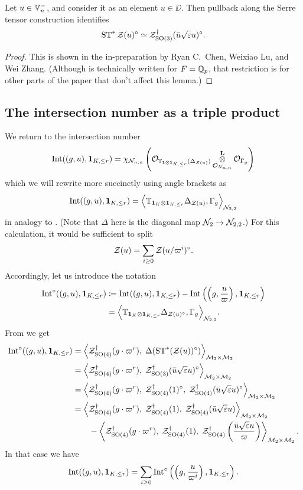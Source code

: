\begin{lemma}
  \label{lem:serre_pullback_divisor}
  Let $u \in \mathbb V_n^-$, and consider it as an element $u \in \DD$.
  Then pullback along the Serre tensor construction identifies
  \[ \operatorname{ST}^\ast \mathcal Z(u)^\circ \simeq \mathcal Z^{\dagger}_{\operatorname{SO}(3)}(\bar u \sqrt{\varepsilon} u)^\circ. \]
\end{lemma}
\begin{proof}
  This is shown in the in-preparation
  \cite{ref:CLZ} by Ryan C.~Chen, Weixiao Lu, and Wei Zhang.
  (Although \cite{ref:CLZ} is technically written for $F = \mathbb Q_p$,
  that restriction is for other parts of the paper that don't affect this lemma.)
\end{proof}

\subsection{The intersection number as a triple product}
We return to the intersection number
\[ \operatorname{Int}((g,u), \mathbf{1}_{K, \le r}) = \chi_{\mathcal N_{n,n}} \left(
      \mathcal{O}_{\mathbb T_{\mathbf{1} \otimes \mathbf{1}_{K, \le r}}(\Delta_{\mathcal Z(u)})}
      \mathop{\otimes}^{\mathbf{L}}_{\mathcal{O}_{\mathcal N_{n,n}}} \mathcal{O}_{\Gamma_g} \right) \]
which we will rewrite more succinctly using angle brackets as
\[ \operatorname{Int}((g,u), \mathbf{1}_{K, \le r}) = \Big\langle
  \mathbb{T}_{\mathbf{1}_K \otimes \mathbf{1}_{K, \le r}}
  \Delta_{\mathcal Z(u)}, \Gamma_g \Big\rangle_{\mathcal N_{2,2}} \]
in analogy to \cite[\S6.1]{ref:AFLspherical}.
(Note that $\Delta$ here is the diagonal map $\mathcal N_2 \to \mathcal N_{2,2}$.)
For this calculation, it would be sufficient to split
\[ \mathcal Z(u) = \sum_{i \ge 0} \mathcal Z(u/\varpi^i)^\circ. \]
Accordingly, let us introduce the notation
\begin{align*}
  \operatorname{Int}^\circ((g,u), \mathbf{1}_{K, \le r})
  &\coloneqq \operatorname{Int}((g,u), \mathbf{1}_{K, \le r}) - \operatorname{Int}\left( \left( g, \frac{u}{\varpi} \right), \mathbf{1}_{K, \le r} \right) \\
  &= \Big\langle \mathbb{T}_{\mathbf{1}_K \otimes \mathbf{1}_{K, \le r}}
    \Delta_{\mathcal Z(u)^\circ}, \Gamma_g \Big\rangle_{\mathcal N_{2,2}}.
\end{align*}
From  we get
\begin{align*}
  \operatorname{Int}^\circ((g,u), \mathbf{1}_{K, \le r})
  &= \left< \mathcal Z^{\dagger}_{\operatorname{SO}(4)}(g \cdot \varpi^r), \; \Delta(\operatorname{ST}^\ast(\mathcal Z(u))^\circ) \right>_{\mathcal M_2 \times \mathcal M_2} \\
  &= \left< \mathcal Z^{\dagger}_{\operatorname{SO}(4)}(g \cdot \varpi^r), \; \mathcal Z^{\dagger}_{\operatorname{SO}(3)}(\bar u \sqrt{\varepsilon} u)^\circ \right>_{\mathcal M_2 \times \mathcal M_2} \\
  &= \left< \mathcal Z^{\dagger}_{\operatorname{SO}(4)}(g \cdot \varpi^r), \; \mathcal Z^{\dagger}_{\operatorname{SO}(4)}(1)^\circ, \; \mathcal Z^{\dagger}_{\operatorname{SO}(4)}(\bar u \sqrt{\varepsilon} u)^\circ \right>_{\mathcal M_2 \times \mathcal M_2} \\
  &= \left< \mathcal Z^{\dagger}_{\operatorname{SO}(4)}(g \cdot \varpi^r), \; \mathcal Z^{\dagger}_{\operatorname{SO}(4)}(1), \; \mathcal Z^{\dagger}_{\operatorname{SO}(4)}(\bar u \sqrt{\varepsilon} u) \right>_{\mathcal M_2 \times \mathcal M_2} \\
  &\qquad- \left< \mathcal Z^{\dagger}_{\operatorname{SO}(4)}(g \cdot \varpi^r), \; \mathcal Z^{\dagger}_{\operatorname{SO}(4)}(1), \; \mathcal Z^{\dagger}_{\operatorname{SO}(4)}\left( \frac{\bar u \sqrt{\varepsilon} u}{\varpi} \right) \right>_{\mathcal M_2 \times \mathcal M_2}.
\end{align*}
In that case we have
\begin{equation}
  \operatorname{Int}((g,u), \mathbf{1}_{K, \le r})
  = \sum_{i \ge 0} \operatorname{Int}^\circ\left( \left( g, \frac{u}{\varpi^i} \right), \mathbf{1}_{K, \le r} \right).
  \label{eq:int_to_int_circ}
\end{equation}

